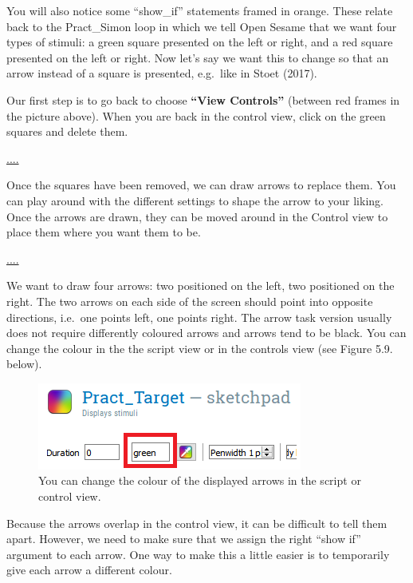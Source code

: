 \documentclass[
]{book}
\begin{document}
You will also notice some ``show\_if'' statements framed in orange. These relate back to the Pract\_Simon loop in which we tell Open Sesame that we want four types of stimuli: a green square presented on the left or right, and a red square presented on the left or right. Now let's say we want this to change so that an arrow instead of a square is presented, e.g.~like in Stoet (2017).

Our first step is to go back to choose \textbf{``View Controls''} (between red frames in the picture above). When you are back in the control view, click on the green squares and delete them.

\url{....}

Once the squares have been removed, we can draw arrows to replace them. You can play around with the different settings to shape the arrow to your liking. Once the arrows are drawn, they can be moved around in the Control view to place them where you want them to be.

\url{....}

We want to draw four arrows: two positioned on the left, two positioned on the right. The two arrows on each side of the screen should point into opposite directions, i.e.~one points left, one points right. The arrow task version usually does not require differently coloured arrows and arrows tend to be black. You can change the colour in the the script view or in the controls view (see Figure 5.9. below).

\begin{figure}

{\centering \includegraphics[width=0.6\linewidth]{images/changesimon/03SimonColour} 

}

\caption{You can change the colour of the displayed arrows in the script or control view.}\label{fig:Figure3-9}
\end{figure}

Because the arrows overlap in the control view, it can be difficult to tell them apart. However, we need to make sure that we assign the right ``show if'' argument to each arrow. One way to make this a little easier is to temporarily give each arrow a different colour.
\end{document}
